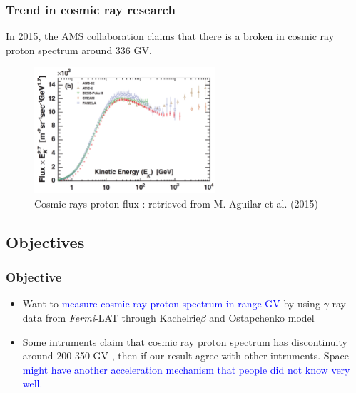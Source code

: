 \documentclass{beamer}
\begin{document}
\begin{frame}
\frametitle{Trend in cosmic ray research}
In 2015, the AMS collaboration claims that there is a broken in cosmic ray proton spectrum around 336 GV.
\begin{figure}
  \includegraphics[width=0.6\textwidth]{proton_spectrum}
  \caption{Cosmic rays proton flux : retrieved from M. Aguilar et al. (2015)}
\end{figure}
\end{frame}

\subsection{Objectives}

\begin{frame}
\frametitle{Objective}
\begin{itemize}
  \item Want to \textcolor{blue}{measure cosmic ray proton spectrum in range GV} by using
  $\gamma$-ray data from \textit{Fermi}-LAT through Kachelrie$\beta$ and Ostapchenko model
  \item Some intruments claim that cosmic ray proton spectrum has discontinuity around 200-350 GV
  , then if our result agree with other intruments. Space \textcolor{blue}{might have another acceleration mechanism that people did not know very well.}
\end{itemize}
\end{frame}
\end{document}
